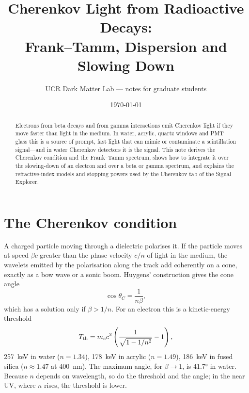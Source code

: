 
\title{Cherenkov Light from Radioactive Decays:\\ Frank--Tamm, Dispersion and Slowing Down}
\author{UCR Dark Matter Lab --- notes for graduate students}
\date{\today}

\maketitle
\seriesnote

\begin{abstract}
Electrons from beta decays and from gamma interactions emit Cherenkov light if they move faster than light in the medium. In water, acrylic, quartz windows and PMT glass this is a source of prompt, fast light that can mimic or contaminate a scintillation signal---and in water Cherenkov detectors it is the signal. This note derives the Cherenkov condition and the Frank--Tamm spectrum, shows how to integrate it over the slowing-down of an electron and over a beta or gamma spectrum, and explains the refractive-index models and stopping powers used by the Cherenkov tab of the Signal Explorer.
\end{abstract}
\tableofcontents

\section{The Cherenkov condition}
A charged particle moving through a dielectric polarises it. If the particle moves at speed $\beta c$ greater than the phase velocity $c/n$ of light in the medium, the wavelets emitted by the polarisation along the track add coherently on a cone, exactly as a bow wave or a sonic boom. Huygens' construction gives the cone angle
\begin{equation}
\cos\theta_C = \frac{1}{n\beta},
\label{eq:angle}
\end{equation}
which has a solution only if $\beta > 1/n$. For an electron this is a kinetic-energy threshold
\begin{equation}
T_\text{th} = m_e c^2\left(\frac{1}{\sqrt{1 - 1/n^2}} - 1\right),
\label{eq:thr}
\end{equation}
\SI{257}{keV} in water ($n=1.34$), \SI{178}{keV} in acrylic ($n=1.49$), \SI{186}{keV} in fused silica ($n\approx1.47$ at \SI{400}{nm}). The maximum angle, for $\beta\to1$, is \ang{41.7} in water. Because $n$ depends on wavelength, so do the threshold and the angle; in the near UV, where $n$ rises, the threshold is lower.

